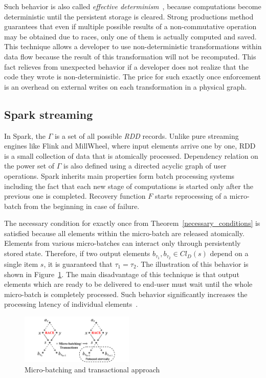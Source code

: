 Such behavior is also called {\em effective determinism}~\cite{akidau2018streaming}, because computations become deterministic until the persistent storage is cleared. Strong productions method guarantees that even if multiple possible results of a non-commutative operation may be obtained due to races, only one of them is actually computed and saved. This technique allows a developer to use non-deterministic transformations within data flow because the result of this transformation will not be recomputed. This fact relieves from unexpected behavior if a developer does not realize that the code they wrote is non-deterministic. The price for such exactly once enforcement is an overhead on external writes on each transformation in a physical graph.

\subsection{Spark streaming}

In Spark, the  $\Gamma$ is a set of all possible {\em RDD} records. Unlike pure streaming engines like Flink and MillWheel, where input elements arrive one by one, RDD is a small collection of data that is atomically processed. Dependency relation on the power set of $\Gamma$ is also defined using a directed acyclic graph of user operations. Spark inherits main properties form batch processing systems including the fact that each new stage of computations is started only after the previous one is completed. Recovery function $F$ starts reprocessing of a micro-batch from the beginning in case of failure.

The necessary condition for exactly once from Theorem~\ref{necessary_conditions} is satisfied because all elements within the micro-batch are released atomically. Elements from various micro-batches can interact only through persistently stored state. Therefore, if two output elements $b_{\tau_1},b_{\tau_2} \in Cl_D(s)$ depend on a single item $s$, it is guaranteed that $\tau_1=\tau_2$. The illustration of this behavior is shown in Figure~\ref{spark_flink}. The main disadvantage of this technique is that output elements which are ready to be delivered to end-user must wait until the whole micro-batch is completely processed. Such behavior significantly increases the processing latency of individual elements~\cite{karimov2018benchmarking}.
 
\begin{figure}[htbp]
  \centering
  \includegraphics[width=0.48\textwidth]{pics/spark-flink}
  \caption{Micro-batching and transactional approach}
  \label{spark_flink}
\end{figure}
 
